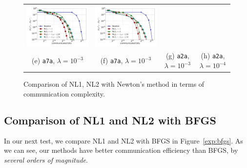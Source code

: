 \documentclass[10pt]{article}
\begin{document}
\begin{figure}[ht]
\begin{center}
{\begin{tabular}{cccc}
				\includegraphics[width = 0.23 \textwidth]{LogReg/a2a/Lambda=1e-3/a2a_nm_nl1_nl2_bits_lmb=0.001.pdf}&
				\includegraphics[width = 0.23 \textwidth]{LogReg/a2a/Lambda=1e-4/a2a_nm_nl1_nl2_bits_lmb=0.0001.pdf}
				\\
				(e) {\tt a7a}, $\lambda=10^{-3}$ &(f) {\tt a7a}, $\lambda=10^{-3}$ & (g) {\tt a2a}, $\lambda=10^{-3}$ &(h) {\tt a2a}, $\lambda=10^{-4}$
		\end{tabular}}
		\caption{Comparison of {\sf NL1}, {\sf NL2} with Newton's method in terms of communication complexity.}
		\label{exp:newton}
	\end{center}
\end{figure}



\subsection{Comparison of {\sf NL1} and {\sf NL2} with BFGS}

In our next test, we compare {\sf NL1} and {\sf NL2}  with BFGS in Figure~\ref{exp:bfgs}. As we can see, our methods have better communication efficiency than BFGS, by {\em several orders of magnitude}.
\end{document}
